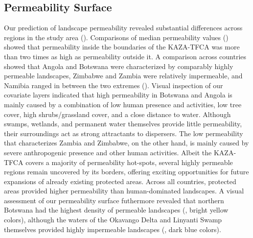 \documentclass[abstract=on,10pt,a4paper,bibliography=totocnumbered]{article}
\begin{document}
\subsection{Permeability Surface}
Our prediction of landscape permeability revealed substantial differences across
regions in the study area (). Comparisons of median
permeability values () showed that permeability inside
the boundaries of the KAZA-TFCA was more than two times as high as permeability
outside it. A comparison across countries showed that Angola and Botswana were
characterized by comparably highly permeable landscapes, Zimbabwe and Zambia
were relatively impermeable, and Namibia ranged in between the two extremes
(). Visual inspection of our covariate layers indicated
that high permeability in Botswana and Angola is mainly caused by a combination
of low human presence and activities, low tree cover, high shrubs/grassland
cover, and a close distance to water. Although swamps, wetlands, and permanent
water themselves provide little permeability, their surroundings act as strong
attractants to dispersers. The low permeability that characterizes Zambia and
Zimbabwe, on the other hand, is mainly caused by severe anthropogenic presence
and other human activities. Albeit the KAZA-TFCA covers a majority of
permeability hot-spots, several highly permeable regions remain uncovered by its
borders, offering exciting opportunities for future expansions of already
existing protected areas. Across all countries, protected areas provided higher
permeability than human-dominated landscapes. A visual assessment of our
permeability surface futhermore revealed that northern Botswana had the highest
density of permeable landscapes (, bright yellow colors),
although the waters of the Okavango Delta and Linyanti Swamp themselves provided
highly impermeable landscapes (, dark blue colors).
\end{document}
